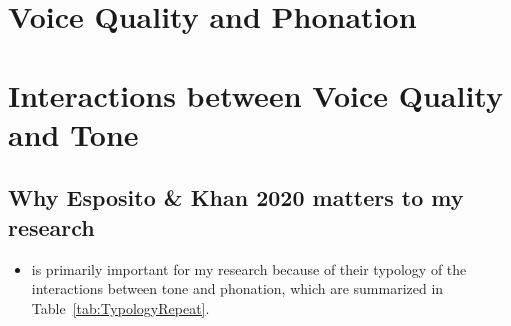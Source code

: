 \section{Voice Quality and Phonation} \label{sec:voice_quality_and_phonation}


\section{Interactions between Voice Quality and Tone} \label{sec:interactions_between_voice_quality_and_tone}

\subsection{Why Esposito \& Khan 2020 matters to my research} \label{sec:WhyEspositoKhanMatters}

\begin{itemize}
    \item \citet{espositoCrossLinguisticPatterns2020} is primarily important for my research because of their typology of the interactions between tone and phonation, which are summarized in Table~\ref{tab:TypologyRepeat}.
\end{itemize}

